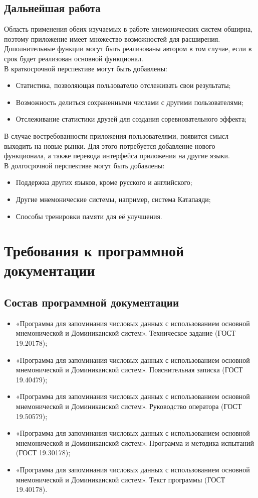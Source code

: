 \documentclass[draft]{article}
\begin{document}
\subsection{Дальнейшая работа}
Область применения обеих изучаемых в работе мнемонических систем обширна, поэтому приложение имеет множество возможностей для расширения. Дополнительные функции могут быть реализованы автором в том случае, если в срок будет реализован основной функционал.\\
В краткосрочной перспективе могут быть добавлены:
\begin{itemize}
\item Статистика, позволяющая пользователю отслеживать свои результаты;
\item Возможность делиться сохраненными числами с другими пользователями;
\item Отслеживание статистики друзей для создания соревновательного эффекта;
\end{itemize}
В случае востребованности приложения пользователями, появится смысл выходить на новые рынки. Для этого потребуется добавление нового функционала, а также перевода интерфейса приложения на другие языки.\\
В долгосрочной перспективе могут быть добавлены: 
\begin{itemize}
\item Поддержка других языков, кроме русского и английского;
\item Другие мнемонические системы, например, система Катапаяди;
\item Способы тренировки памяти для её улучшения.
\end{itemize}
\newpage
\section {Требования к программной документации}
\subsection{Состав программной документации}
\begin{itemize}
\item «Программа для запоминания числовых данных с использованием основной мнемонической и Доминиканской систем». Техническое задание (ГОСТ 19.20178);
\item «Программа для запоминания числовых данных с использованием основной мнемонической и Доминиканской систем». Пояснительная записка (ГОСТ 19.40479);
\item «Программа для запоминания числовых данных с использованием основной мнемонической и Доминиканской систем». Руководство оператора (ГОСТ 19.50579);
\item «Программа для запоминания числовых данных с использованием основной мнемонической и Доминиканской систем». Программа и методика испытаний (ГОСТ 19.30178);
\item «Программа для запоминания числовых данных с использованием основной мнемонической и Доминиканской систем». Текст программы (ГОСТ 19.40178).
\end{itemize}
\end{document}
